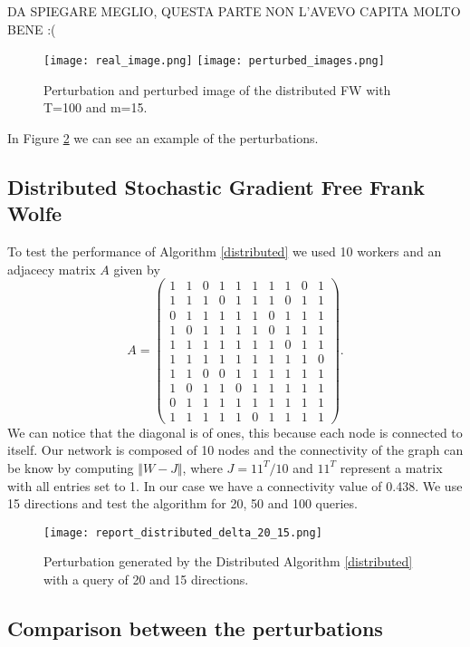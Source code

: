 DA SPIEGARE MEGLIO, QUESTA PARTE NON L'AVEVO CAPITA MOLTO BENE :(

\begin{figure}[htbp]
	\centering
	\texttt{[image: real\_image.png]}
	\texttt{[image: perturbed\_images.png]}
	\caption{Perturbation and perturbed image of the distributed FW with T=100 and m=15.}
	\label{fig:variance-reduced}
\end{figure}
In Figure \ref{fig:variance-reduced} we can see an example of the perturbations.


\subsection{Distributed Stochastic Gradient Free Frank Wolfe}
To test the performance of Algorithm \ref{distributed} we used 10 workers and an adjacecy matrix $A$ given by 
\[ A = 
\begin{pmatrix}
1& 1& 0& 1& 1& 1& 1& 1& 0& 1\\
1& 1& 1& 0& 1& 1& 1& 0& 1& 1\\
0& 1& 1& 1& 1& 1& 0& 1& 1& 1\\
1& 0& 1& 1& 1& 1& 0& 1& 1& 1\\
1& 1& 1& 1& 1& 1& 1& 0& 1& 1\\
1& 1& 1& 1& 1& 1& 1& 1& 1& 0\\
1& 1& 0& 0& 1& 1& 1& 1& 1& 1\\
1& 0& 1& 1& 0& 1& 1& 1& 1& 1\\
0& 1& 1& 1& 1& 1& 1& 1& 1& 1\\
1& 1& 1& 1& 1& 0& 1& 1& 1& 1	
\end{pmatrix}
.\]
We can notice that the diagonal is of ones, this because each node is connected to itself. Our network is composed of 10 nodes and the connectivity of the graph can be know by computing $\Vert W- J \Vert$, where $J= 11^T/10$ and $11^T$ represent a matrix with all entries set to 1. In our case we have a connectivity value of 0.438. We use 15 directions and test the algorithm for 20, 50 and 100 queries.

\begin{figure}[htbp]
	\centering
	\texttt{[image: report\_distributed\_delta\_20\_15.png]}
	\caption{Perturbation generated by the Distributed Algorithm \ref{distributed} with a query of 20 and 15 directions.}
	\label{fig:variance-reduced}
\end{figure}

\subsection{Comparison between the perturbations}
